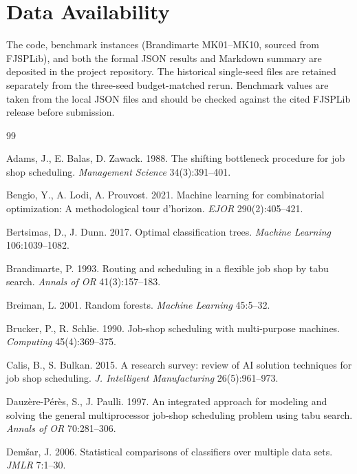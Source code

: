 \documentclass[12pt]{article}
\begin{document}
\section*{Data Availability}
The code, benchmark instances (Brandimarte MK01--MK10, sourced from FJSPLib), and both the formal JSON results and Markdown summary are deposited in the project repository. The historical single-seed files are retained separately from the three-seed budget-matched rerun. Benchmark values are taken from the local JSON files and should be checked against the cited FJSPLib release before submission.


\begin{thebibliography}{99}

 Adams, J., E. Balas, D. Zawack. 1988. The shifting bottleneck procedure for job shop scheduling. \textit{Management Science} 34(3):391--401.

 Bengio, Y., A. Lodi, A. Prouvost. 2021. Machine learning for combinatorial optimization: A methodological tour d'horizon. \textit{EJOR} 290(2):405--421.

 Bertsimas, D., J. Dunn. 2017. Optimal classification trees. \textit{Machine Learning} 106:1039--1082.

 Brandimarte, P. 1993. Routing and scheduling in a flexible job shop by tabu search. \textit{Annals of OR} 41(3):157--183.

 Breiman, L. 2001. Random forests. \textit{Machine Learning} 45:5--32.

 Brucker, P., R. Schlie. 1990. Job-shop scheduling with multi-purpose machines. \textit{Computing} 45(4):369--375.

 Calis, B., S. Bulkan. 2015. A research survey: review of AI solution techniques for job shop scheduling. \textit{J. Intelligent Manufacturing} 26(5):961--973.

 Dauz\`ere-P\'er\`es, S., J. Paulli. 1997. An integrated approach for modeling and solving the general multiprocessor job-shop scheduling problem using tabu search. \textit{Annals of OR} 70:281--306.

 Dem\v{s}ar, J. 2006. Statistical comparisons of classifiers over multiple data sets. \textit{JMLR} 7:1--30.


\end{thebibliography}
\end{document}
